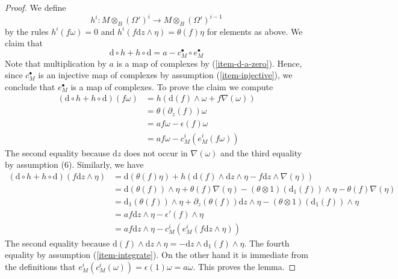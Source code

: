 \documentclass[10pt,a4paper]{amsart}
\theoremstyle{plain}
\theoremstyle{definition}
\theoremstyle{remark}
\numberwithin{equation}{subsection}
\begin{document}
\begin{proof}
\medskip\noindent
We define
$$
h^i : M \otimes_B (\Omega')^i \longrightarrow M \otimes_B (\Omega')^{i - 1}
$$
by the rules $h^i(f \omega) = 0$ and
$h^i(f \text{d}z \wedge \eta) = \theta(f) \eta$
for elements as above.  We claim that
$$
\text{d} \circ h + h \circ \text{d} = a - c_M^\bullet \circ e_M^\bullet
$$
Note that multiplication by $a$ is a map of complexes
by (\ref{item-d-a-zero}). Hence, since $c_M^\bullet$ is an injective map
of complexes by assumption (\ref{item-injective}), we conclude that
$e_M^\bullet$ is a map of complexes. To prove the claim we compute
\begin{align*}
(\text{d} \circ h + h \circ \text{d})(f \omega)
& =
h\left(\text{d}(f) \wedge \omega + f \nabla(\omega)\right)
\\
& =
\theta(\partial_z(f)) \omega
\\
& =
a f\omega - \epsilon(f)\omega 
\\
& =
a f \omega - c^i_M(e^i_M(f\omega))
\end{align*}
The second equality because $\text{d}z$ does not occur in $\nabla(\omega)$
and the third equality by assumption (6). Similarly, we have
\begin{align*}
(\text{d} \circ h + h \circ \text{d})(f \text{d}z \wedge \eta)
& =
\text{d}(\theta(f) \eta) +
h\left(\text{d}(f) \wedge \text{d}z \wedge \eta -
f \text{d}z \wedge \nabla(\eta)\right)
\\
& =
\text{d}(\theta(f)) \wedge \eta + \theta(f) \nabla(\eta)
- (\theta \otimes 1)(\text{d}_1(f)) \wedge \eta
- \theta(f) \nabla(\eta)
\\
& =
\text{d}_1(\theta(f)) \wedge \eta +
\partial_z(\theta(f)) \text{d}z \wedge \eta -
(\theta \otimes 1)(\text{d}_1(f)) \wedge \eta
\\
& =
a f \text{d}z \wedge \eta - \epsilon'(f) \wedge \eta \\
& = a f \text{d}z \wedge \eta - c^i_M(e^i_M(f \text{d}z \wedge \eta))
\end{align*}
The second equality because
$\text{d}(f) \wedge \text{d}z \wedge \eta =
- \text{d}z \wedge \text{d}_1(f) \wedge \eta$.
The fourth equality by assumption (\ref{item-integrate}).
On the other hand it is immediate from the definitions
that $e^i_M(c^i_M(\omega)) = \epsilon(1) \omega = a \omega$.
This proves the lemma.
\end{proof}
\end{document}
